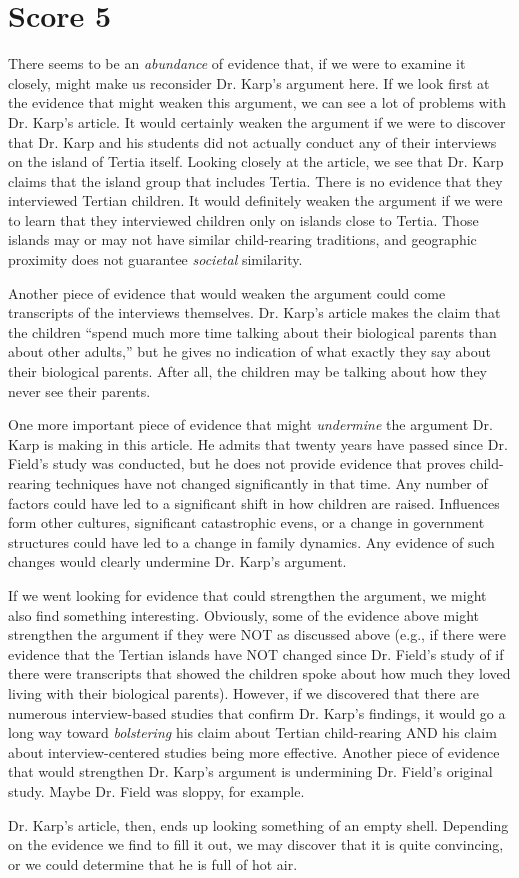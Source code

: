 \section{Score 5}
There seems to be an \emph{abundance} of evidence that, if we were to examine it closely, might make us reconsider Dr. Karp's argument here.
If we look first at the evidence that might weaken this argument, we can see a lot of problems with Dr. Karp's article.
It would certainly weaken the argument if we were to discover that Dr. Karp and his students did not actually conduct any of their interviews on the island of Tertia itself.
Looking closely at the article, we see that Dr. Karp claims that the island group that includes Tertia.
There is no evidence that they interviewed Tertian children.
It would definitely weaken the argument if we were to learn that they interviewed children only on islands close to Tertia.
Those islands may or may not have similar child-rearing traditions, and geographic proximity does not guarantee \emph{societal} similarity.

Another piece of evidence that would weaken the argument could come transcripts of the interviews themselves.
Dr. Karp's article makes the claim that the children ``spend much more time talking about their biological parents than about other adults,'' but he gives no indication of what exactly they say about their biological parents.
After all, the children may be talking about how they never see their parents.

One more important piece of evidence that might \emph{undermine} the argument Dr. Karp is making in this article.
He admits that twenty years have passed since Dr. Field's study was conducted, but he does not provide evidence that proves child-rearing techniques have not changed significantly in that time.
Any number of factors could have led to a significant shift in how children are raised.
Influences form other cultures, significant catastrophic evens, or a change in government structures could have led to a change in family dynamics.
Any evidence of such changes would clearly undermine Dr. Karp's argument.

If we went looking for evidence that could strengthen the argument, we might also find something interesting.
Obviously, some of the evidence above might strengthen the argument if they were NOT as discussed above (e.g., if there were evidence that the Tertian islands have NOT changed since Dr. Field's study of if there were transcripts that showed the children spoke about how much they loved living with their biological parents).
However, if we discovered that there are numerous interview-based studies that confirm Dr. Karp's findings, it would go a long way toward \emph{bolstering} his claim about Tertian child-rearing AND his claim about interview-centered studies being more effective.
Another piece of evidence that would strengthen Dr. Karp's argument is undermining Dr. Field's original study.
Maybe Dr. Field was sloppy, for example.

Dr. Karp's article, then, ends up looking something of an empty shell.
Depending on the evidence we find to fill it out, we may discover that it is quite convincing, or we could determine that he is full of hot air.